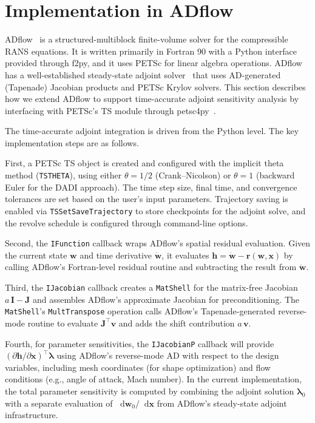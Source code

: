 \documentclass[journal]{new-aiaa}
\newcommand{\mb}[1]{\mathbf{#1}}
\newcommand{\mbg}[1]{\bm{#1}}
\renewcommand{\d}{\mathop{}\!\mathrm{d}} %
\newcommand{\p}{\partial}
\begin{document}
\section{Implementation in ADflow}\label{sec:implementation}
ADflow~\cite{ADflow2020} is a structured-multiblock finite-volume solver for the compressible RANS equations.
It is written primarily in Fortran 90 with a Python interface provided through f2py, and it uses PETSc for linear algebra operations.
ADflow has a well-established steady-state adjoint solver~\cite{Kenway2019} that uses AD-generated (Tapenade) Jacobian products and PETSc Krylov solvers.
This section describes how we extend ADflow to support time-accurate adjoint sensitivity analysis by interfacing with PETSc's TS module through petsc4py~\cite{Dalcin2011}.

The time-accurate adjoint integration is driven from the Python level.
The key implementation steps are as follows.

First, a PETSc TS object is created and configured with the implicit theta method (\texttt{TSTHETA}), using either $\theta = 1/2$ (Crank--Nicolson) or $\theta = 1$ (backward Euler for the DADI approach).
The time step size, final time, and convergence tolerances are set based on the user's input parameters.
Trajectory saving is enabled via \texttt{TSSetSaveTrajectory} to store checkpoints for the adjoint solve, and the revolve schedule is configured through command-line options.

Second, the \texttt{IFunction} callback wraps ADflow's spatial residual evaluation.
Given the current state $\mb{w}$ and time derivative $\dot{\mb{w}}$, it evaluates $\mb{h} = \dot{\mb{w}} - \mb{r}(\mb{w}, \mb{x})$ by calling ADflow's Fortran-level residual routine and subtracting the result from $\dot{\mb{w}}$.

Third, the \texttt{IJacobian} callback creates a \texttt{MatShell} for the matrix-free Jacobian $a \, \mb{I} - \mb{J}$ and assembles ADflow's approximate Jacobian for preconditioning.
The \texttt{MatShell}'s \texttt{MultTranspose} operation calls ADflow's Tapenade-generated reverse-mode routine to evaluate $\mb{J}^\intercal \mb{v}$ and adds the shift contribution $a \, \mb{v}$.

Fourth, for parameter sensitivities, the \texttt{IJacobianP} callback will provide $(\p \mb{h}/\p \mb{x})^\intercal \mbg{\lambda}$ using ADflow's reverse-mode AD with respect to the design variables, including mesh coordinates (for shape optimization) and flow conditions (e.g., angle of attack, Mach number).
In the current implementation, the total parameter sensitivity is computed by combining the adjoint solution $\mbg{\lambda}_0$ with a separate evaluation of $\d \mb{w}_0/\d \mb{x}$ from ADflow's steady-state adjoint infrastructure.
\end{document}
